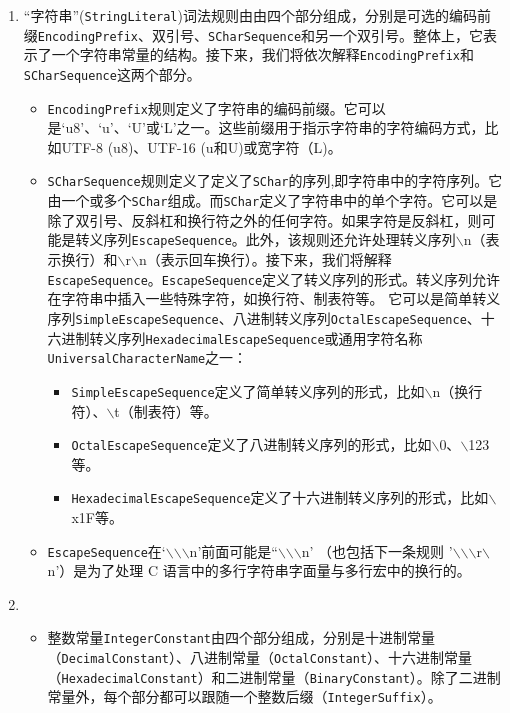 \documentclass[a4paper, justified]{tufte-handout}
\begin{document}
\begin{solution}
  \begin{enumerate}[(1)]
    \item ``字符串''(\texttt{StringLiteral})词法规则由由四个部分组成，分别是可选的编码前缀\texttt{EncodingPrefix}、双引号、\texttt{SCharSequence}和另一个双引号。整体上，它表示了一个字符串常量的结构。接下来，我们将依次解释\texttt{EncodingPrefix}和\texttt{SCharSequence}这两个部分。
      \begin{itemize}
        \item \texttt{EncodingPrefix}规则定义了字符串的编码前缀。它可以是`u8'、`u'、`U'或`L'之一。这些前缀用于指示字符串的字符编码方式，比如UTF-8 (u8)、UTF-16 (u和U)或宽字符（L)。
        \item \texttt{SCharSequence}规则定义了定义了\texttt{SChar}的序列,即字符串中的字符序列。它由一个或多个\texttt{SChar}组成。而\texttt{SChar}定义了字符串中的单个字符。它可以是除了双引号、反斜杠和换行符之外的任何字符。如果字符是反斜杠，则可能是转义序列\texttt{EscapeSequence}。此外，该规则还允许处理转义序列$\backslash$n（表示换行）和$\backslash$r$\backslash$n（表示回车换行）。接下来，我们将解释\texttt{EscapeSequence}。\texttt{EscapeSequence}定义了转义序列的形式。转义序列允许在字符串中插入一些特殊字符，如换行符、制表符等。
它可以是简单转义序列\texttt{SimpleEscapeSequence}、八进制转义序列\texttt{OctalEscapeSequence}、十六进制转义序列\texttt{HexadecimalEscapeSequence}或通用字符名称\texttt{UniversalCharacterName}之一：
          \begin{itemize}
            \item \texttt{SimpleEscapeSequence}定义了简单转义序列的形式，比如$\backslash$n（换行符）、$\backslash$t（制表符）等。
            \item \texttt{OctalEscapeSequence}定义了八进制转义序列的形式，比如$\backslash$0、$\backslash$123等。
            \item \texttt{HexadecimalEscapeSequence}定义了十六进制转义序列的形式，比如$\backslash$x1F等。
          \end{itemize}
        \item \texttt{EscapeSequence}在`$\backslash$$\backslash$$\backslash$n'前面可能是``$\backslash$$\backslash$$\backslash$n' （也包括下一条规则 '$\backslash$$\backslash$$\backslash$r$\backslash$n'）是为了处理 C 语言中的多行字符串字面量与多行宏中的换行的。
      \end{itemize}
    \item
      \begin{itemize}
        \item 整数常量\texttt{IntegerConstant}由四个部分组成，分别是十进制常量（\texttt{DecimalConstant}）、八进制常量（\texttt{OctalConstant}）、十六进制常量（\texttt{HexadecimalConstant}）和二进制常量（\texttt{BinaryConstant}）。除了二进制常量外，每个部分都可以跟随一个整数后缀（\texttt{IntegerSuffix}）。

\end{itemize}
\end{enumerate}
\end{solution}
\end{document}
